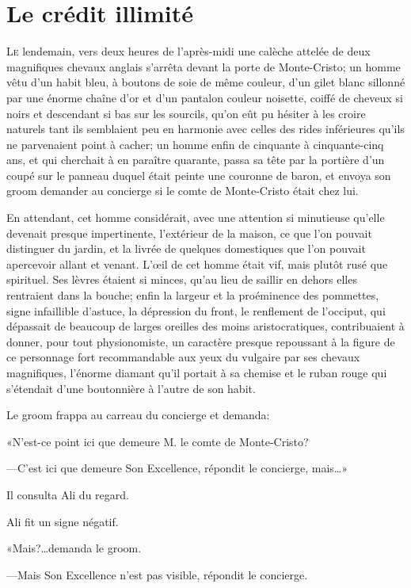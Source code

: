 \chapter{Le crédit illimité}

\lettrine{L}{e} lendemain, vers deux heures de l'après-midi une calèche attelée de deux magnifiques chevaux anglais s'arrêta devant la porte de Monte-Cristo; un homme vêtu d'un habit bleu, à boutons de soie de même couleur, d'un gilet blanc sillonné par une énorme chaîne d'or et d'un pantalon couleur noisette, coiffé de cheveux si noirs et descendant si bas sur les sourcils, qu'on eût pu hésiter à les croire naturels tant ils semblaient peu en harmonie avec celles des rides inférieures qu'ils ne parvenaient point à cacher; un homme enfin de cinquante à cinquante-cinq ans, et qui cherchait à en paraître quarante, passa sa tête par la portière d'un coupé sur le panneau duquel était peinte une couronne de baron, et envoya son groom demander au concierge si le comte de Monte-Cristo était chez lui. 

En attendant, cet homme considérait, avec une attention si minutieuse qu'elle devenait presque impertinente, l'extérieur de la maison, ce que l'on pouvait distinguer du jardin, et la livrée de quelques domestiques que l'on pouvait apercevoir allant et venant. L'œil de cet homme était vif, mais plutôt rusé que spirituel. Ses lèvres étaient si minces, qu'au lieu de saillir en dehors elles rentraient dans la bouche; enfin la largeur et la proéminence des pommettes, signe infaillible d'astuce, la dépression du front, le renflement de l'occiput, qui dépassait de beaucoup de larges oreilles des moins aristocratiques, contribuaient à donner, pour tout physionomiste, un caractère presque repoussant à la figure de ce personnage fort recommandable aux yeux du vulgaire par ses chevaux magnifiques, l'énorme diamant qu'il portait à sa chemise et le ruban rouge qui s'étendait d'une boutonnière à l'autre de son habit. 

Le groom frappa au carreau du concierge et demanda: 

«N'est-ce point ici que demeure M. le comte de Monte-Cristo? 

—C'est ici que demeure Son Excellence, répondit le concierge, mais\dots» 

Il consulta Ali du regard. 

Ali fit un signe négatif. 

«Mais?\dots demanda le groom. 

—Mais Son Excellence n'est pas visible, répondit le concierge. 

